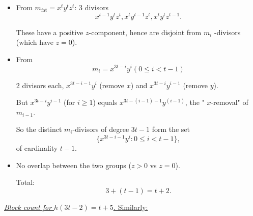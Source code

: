 \documentclass[11pt,reqno]{amsart}
\begin{document}
\begin{itemize}
\item From $m_{\mathrm{fat}}=x^{t}y^{t}z^{t}$: 3 divisors 
\begin{equation*}
x^{t-1}y^{t}z^{t},x^{t}y^{t-1}z^{t},x^{t}y^{t}z^{t-1}.
\end{equation*}

\noindent%
These have a positive $z$-component, hence are disjoint from $m_{i}$%
-divisors (which have $z=0$).

\item From 
\begin{equation*}
m_{i}=x^{3t-i}y^{i}(0\leq i<t-1)
\end{equation*}

\noindent%
2 divisors each, $x^{3t-i-1}y^{i}$ (remove $x$) and $x^{3t-i}y^{i-1}$
(remove $y$). 

\medskip%

\noindent%
But $x^{3t-i}y^{i-1}$ (for $i\geq 1$) equals $x^{3t-(i-1)-1}y^{(i-1)}$, the "%
$x$-removal" of $m_{i-1}$.

\medskip%

\noindent
So the distinct $m_{i}$-divisors of degree $3t-1$ form the set 
\begin{equation*}
\{x^{3t-i-1}y^{i}:0\leq i<t-1\},
\end{equation*}%
\noindent%
of cardinality $t-1$.

\item No overlap between the two groups ($z>0$ vs $z=0$).

\noindent%
Total:%
\begin{equation*}
3+(t-1)=t+2.
\end{equation*}
\end{itemize}

\bigskip 
\medskip%

\noindent \underline{\textit{Block count for $h(3t-2)=t+5$.} Similarly:}
\end{document}
